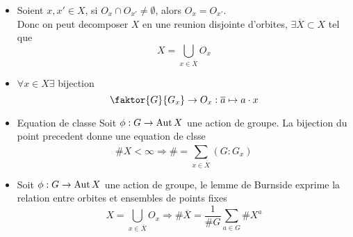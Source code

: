 \documentclass[../main.tex]{subfiles}
\begin{document}
\begin{itemize}
\item Soient $x,x'\in X$, si $O_x\cap O_{x'} \neq \emptyset$, alors $ O_x= O_{x'}$.\\
	Donc on peut decomposer $X$ en une reunion disjointe d'orbites, $\exists \overline{X}\subset X$ tel que
	\[ 
	X= \bigcup_{x\in \overline{X}} O_x
	\]
		
\item $\forall x \in X\exists$ bijection
	\[ 
	\faktor{G}{G_x}\to O_x: \overline{a}\mapsto a\cdot x
	\]
		

\item Equation de classe
	Soit $\phi: G \to \operatorname{Aut} X$ une action de groupe. La bijection du point precedent donne une equation de clsse
	\[ 
	\# X < \infty \Rightarrow \#= \sum_{x\in \overline{X}}^{ } ( G: G_x) 
	\]
	
\item Soit $\phi:G\to \operatorname{Aut} X $ une action de groupe, le lemme de Burnside exprime la relation entre orbites et ensembles de points fixes
	\[ 
	X = \bigcup_{x\in \overline{X}} O_x \Rightarrow \# \overline{X} = \frac{1}{\# G} \sum_{a\in G}^{ } \# X ^{a}		
	\]
	
\end{itemize}
\end{document}
